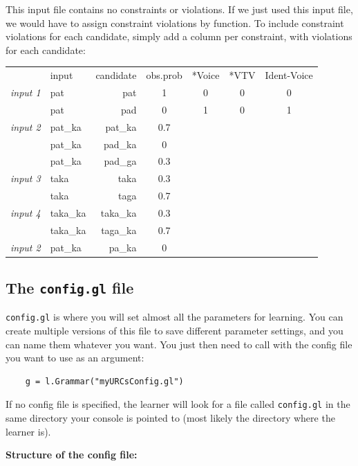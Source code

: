\documentclass[12]{article}
\begin{document}
This input file contains no constraints or violations.  If we just used this input file, we would have to assign constraint violations by function.  To include constraint violations for each candidate, simply add a column per constraint, with violations for each candidate:

\begin{tabular}{r|l|r|c|c|c|c|}
	\cline{2-4}
	&input & candidate & obs.prob & *Voice & *VTV & Ident-Voice \\
	\cline{2-4}
	{\it input 1} & pat & pat & 1 & 0 & 0 & 0\\
	& pat & pad & 0 & 1 & 0 & 1 \\
	\cline{2-4}
	{\it input 2} & pat\_ka & pat\_ka & 0.7 & \\
	& pat\_ka & pad\_ka & 0 \\
	& pat\_ka & pad\_ga & 0.3\\
	\cline{2-4}
	{\it input 3} & taka & taka & 0.3 \\
	& taka & taga & 0.7 \\
	\cline{2-4}
	{\it input 4} & taka\_ka & taka\_ka & 0.3 \\
	& taka\_ka & taga\_ka & 0.7 \\
	\cline{2-4}
	{\it input 2} & pat\_ka  & pa\_ka	& 0 \\
	\cline{2-4}
	
\end{tabular}


\subsection{The \texttt{config.gl} file}\label{configInstructions}

\texttt{config.gl} is where you will set almost all the parameters for learning.  You can create multiple versions of this file to save different parameter settings, and you can name them whatever you want.  You just then need to call  with the config file you want to use as an argument:

\begin{verbatim}
	g = l.Grammar("myURCsConfig.gl")
\end{verbatim}

If no config file is specified, the learner will look for a file called \texttt{config.gl} in the same directory your console is pointed to (most likely the directory where the learner is).

{\bf Structure of the config file:} 
\end{document}
